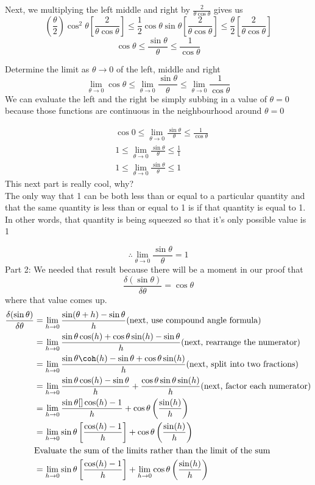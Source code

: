 \documentclass{article}
\begin{document}
Next, we multiplying the left middle and right by $\frac{2}{\theta \cos \theta}$ gives us 
$$
    \left(\frac{\theta}{2}\right) \cos ^2 \theta \left[\frac{2}{\theta \cos \theta}\right] \leq \frac{1}{2}\cos \theta \sin \theta \left[\frac{2}{\theta \cos \theta}\right] \leq \frac{\theta}{2} \left[\frac{2}{\theta \cos \theta}\right]
$$
$$\cos \theta \leq \frac{\sin \theta}{\theta} \leq \frac{1}{\cos \theta}$$

Determine the limit as $\theta \to 0$ of the left, middle and right
$$\lim_{\theta \to 0}\cos \theta \leq \lim_{\theta \to 0}\frac{\sin \theta}{\theta} \leq \lim_{\theta \to 0}\frac{1}{\cos \theta}$$
We can evaluate the left and the right be simply subbing in a value of $\theta=0$ because those functions are continuous in the neighbourhood around $\theta=0$

\begin{align*}
   & \cos 0 \leq \lim_{\theta \to 0} \frac{\sin \theta}{\theta} \leq \frac{1}{\cos \theta}\\
   & 1 \leq \lim_{\theta \to 0} \frac{\sin \theta}{\theta} \leq \frac{1}{1}\\
   & 1 \leq \lim_{\theta \to 0} \frac{\sin \theta}{\theta} \leq 1
\end{align*}
This next part is really cool, why?\\
The only way that 1 can be both less than or equal to a particular quantity and that the same quantity is less than or equal to 1 is if that quantity is equal to 1.\\
In other words, that quantity is being squeezed so that it’s only possible value is 1

$$\therefore \lim_{\theta \to 0}\frac{\sin \theta}{\theta}=1$$
Part 2:  We needed that result because there will be a moment in our proof that $$\frac{\delta(\sin \theta)}{\delta \theta}=\cos \theta$$ where that value comes up.
\begin{align*}
    \frac{\delta (\sin \theta)}{\delta \theta}&=\lim_{h \to 0}\frac{\sin(\theta+h)-\sin \theta}{h} \text{(next, use compound angle formula)}\\
    &=\lim_{h\to 0}\frac{\sin \theta \cos (h)+\cos \theta \sin(h)-\sin \theta}{h} \text{(next, rearrange the numerator)}\\
    &= \lim_{h\to 0}\frac{\sin \theta \coh (h)-\sin \theta +\cos \theta \sin(h)}{h} \text{(next, split into two fractions)}\\ 
    &=\lim_{h \to 0} \frac{\sin \theta \cos(h)-\sin \theta }{h}+\frac{\cos \theta \sin \theta \sin(h)}{h} \text{(next, factor each numerator)}\\
    &=\lim_{h \to 0} \frac{\sin \theta []\cos (h)-1}{h}+\cos \theta \left(\frac{\sin (h)}{h}\right)\\
    &=\lim_{h \to 0} \sin \theta \left[\frac{\cos (h)-1}{h}\right]+ \cos \theta \left(\frac{\sin (h)}{h}\right)\\    
    &\text{Evaluate the sum of the limits rather than the limit of the sum}\\
    &=\lim_{h \to 0} \sin \theta \left[\frac{\cos (h)-1}{h}\right]+ \lim_{h \to 0}\cos \theta \left(\frac{\sin (h)}{h}\right)\\    
\end{align*}
\end{document}
